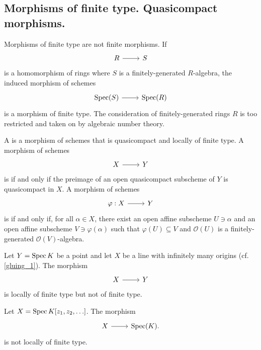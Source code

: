 \documentclass [11 pt, oneside] {article}
\begin{document}
\subsection{Morphisms of finite type. Quasicompact morphisms.}
Morphisms of finite type are not finite morphisms. If
\[
\begin{tikzcd}
R\ar[r]& S
\end{tikzcd}
\]
is a homomorphism of rings where $S$ is a finitely-generated $R$-algebra, the induced morphism of schemes 
\[
\begin{tikzcd}
\Spec(S)\ar[r]&\Spec(R)
\end{tikzcd}
\]
is a morphism of finite type. The consideration of finitely-generated rings $R$ is too restricted and taken on by algebraic number theory.

A  is a morphism of schemes that is quasicompact and locally of finite type. A morphism of schemes
\[
\begin{tikzcd}
X\ar[r]&Y
\end{tikzcd}
\]
is  if and only if the preimage of an open quasicompact subscheme of $Y$ is quasicompact in $X$. A morphism of schemes 
\[
\begin{tikzcd}
\varphi:X\ar[r]& Y
\end{tikzcd}
\]
is  if and only if, for all $\alpha\in X$, there exist an open affine subscheme $U\ni \alpha$ and an open affine subscheme $V \ni \varphi(\alpha)$ such that $\varphi(U)\subseteq V$ and $\mathscr{O}(U)$ is a finitely-generated $\mathscr{O}(V)$-algebra.

\begin{example}[ ]\label{}\text{}
Let $Y=\operatorname{Spec} K$ be a point and let $X$ be a line with infinitely many origins (cf. \cref{gluing_1}). The morphism 
\[
\begin{tikzcd}
X\ar[r]&Y
\end{tikzcd}
\]
is locally of finite type but not of finite type.
\end{example}

\begin{example}[ ]\label{}\text{}
Let $X =\operatorname{Spec} K[z_1,z_2,\hdots]$. The morphism 
\[
\begin{tikzcd}
X\ar[r]& \Spec(K).
\end{tikzcd}
\]
is not locally of finite type.
\end{example}
\end{document}
